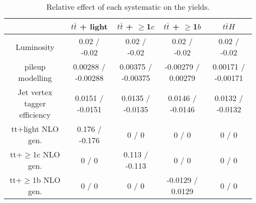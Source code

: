 \documentclass[10pt]{article}
\begin{document}
\begin{table}[htbp]
\begin{center}
\begin{tabular}{|c|c|c|c|c|}
\hline 
      & $t\bar{t}$ + light      & $t\bar{t}$ + $\geq$1$c$      & $t\bar{t}$ + $\geq$1$b$      & $t\bar{t}H$ \\ 
\hline 
  Luminosity & 0.02 / -0.02 & 0.02 / -0.02 & 0.02 / -0.02 & 0.02 / -0.02 \\ 
  pileup modelling & 0.00288 / -0.00288 & 0.00375 / -0.00375 & -0.00279 / 0.00279 & 0.00171 / -0.00171 \\ 
  Jet vertex tagger efficiency & 0.0151 / -0.0151 & 0.0135 / -0.0135 & 0.0146 / -0.0146 & 0.0132 / -0.0132 \\ 
  tt+light NLO gen. & 0.176 / -0.176 & 0 / 0 & 0 / 0 & 0 / 0 \\ 
  tt+$\geq$1c NLO gen. & 0 / 0 & 0.113 / -0.113 & 0 / 0 & 0 / 0 \\ 
  tt+$\geq$1b NLO gen. & 0 / 0 & 0 / 0 & -0.0129 / 0.0129 & 0 / 0 \\ 
\hline 
\end{tabular} 
\caption{Relative effect of each systematic on the yields.} 
\end{center} 
\end{table} 
\end{document}
